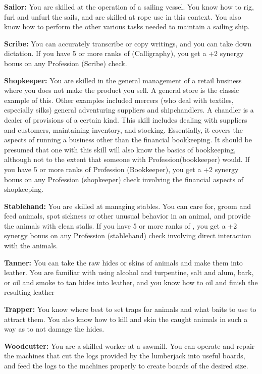 \begin{itemize*}
	\item \textbf{Sailor:} You are skilled at the operation of a sailing vessel. You know how to rig, furl and unfurl the sails, and are skilled at rope use in this context. You also know how to perform the other various tasks needed to maintain a sailing ship.
	\item \textbf{Scribe:} You can accurately transcribe or copy writings, and you can take down dictation. If you have 5 or more ranks of  (Calligraphy), you get a +2 synergy bonus on any Profession (Scribe) check.
	\item \textbf{Shopkeeper:} You are skilled in the general management of a retail business where you does not make the product you sell. A general store is the classic example of this. Other examples included mercers (who deal with textiles, especially silks) general adventuring suppliers and shipchandlers. A chandler is a dealer of provisions of a certain kind. This skill includes dealing with suppliers and customers, maintaining inventory, and stocking. Essentially, it covers the aspects of running a business other than the financial bookkeeping. It should be presumed that one with this skill will also know the basics of bookkeeping, although not to the extent that someone with Profession(bookkeeper) would. If you have 5 or more ranks of Profession (Bookkeeper), you get a +2 synergy bonus on any Profession (shopkeeper) check involving the financial aspects of shopkeeping.
	\item \textbf{Stablehand:} You are skilled at managing stables. You can care for, groom and feed animals, spot sickness or other unusual behavior in an animal, and provide the animals with clean stalls. If you have 5 or more ranks of , you get a +2 synergy bonus on any Profession (stablehand) check involving direct interaction with the animals.
	\item \textbf{Tanner:} You can take the raw hides or skins of animals and make them into leather. You are familiar with using alcohol and turpentine, salt and alum, bark, or oil and smoke to tan hides into leather, and you know how to oil and finish the resulting leather
	\item \textbf{Trapper:} You know where best to set traps for animals and what baits to use to attract them. You also know how to kill and skin the caught animals in such a way as to not damage the hides.
	\item \textbf{Woodcutter:} You are a skilled worker at a sawmill. You can operate and repair the machines that cut the logs provided by the lumberjack into useful boards, and feed the logs to the machines properly to create boards of the desired size.
\end{itemize*}